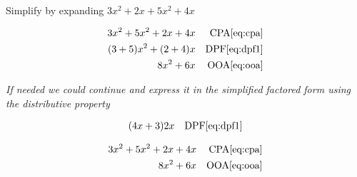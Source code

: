 \documentclass[20150903-160354-rs2.2-MarksMathNotebook.tex]{subfiles}
\begin{document}
\begin{example}[id:20141106-152339] \label{20141106-152339}  \hfill \\

Simplify by expanding $3x^2+2x+5x^2+4x$

\soln

\solnsteps
\begin{align*}
3x^2+5x^2+2x+4x && \text{CPA} \eqref{eq:cpa} \\
(3+5)x^2+(2+4)x && \text{DPF} \eqref{eq:dpf1} \\
8x^2+6x && \text{OOA} \eqref{eq:ooa}
\end{align*}

\emph{If needed we could continue and express it in the simplified factored form using the distributive property}

\begin{align*}
(4x+3)2x && \text{DPF} \eqref{eq:dpf1} \\
\end{align*}

\soln

\lesssteps
\begin{align*}
3x^2 + 5x^2 + 2x + 4x && \text{CPA} \eqref{eq:cpa} \\
8x^2+6x && \text{OOA} \eqref{eq:ooa}
\end{align*}
\end{example}
\end{document}
